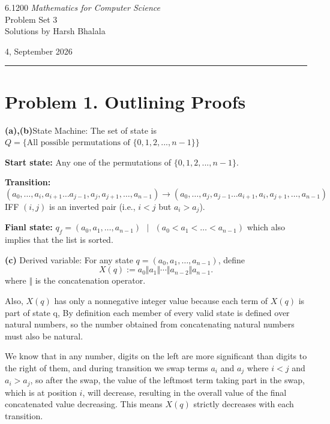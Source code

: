 \documentclass{article}
\begin{document}
\noindent
\begin{minipage}[t]{0.68\textwidth}
    {\large 6.1200 \textit{Mathematics for Computer Science}}\\[4pt]
    {\large Problem Set 3}\\[4pt]
    {\large Solutions by Harsh Bhalala}
\end{minipage}%
\hfill
\begin{minipage}[t]{0.27\textwidth}
    \raggedleft
    {\large 4, September 2026}
\end{minipage}

\vspace{6pt}

\noindent\rule{\textwidth}{0.5pt}

\section*{Problem 1. Outlining Proofs}

\textbf{(a),(b)}State Machine:
The set of state is $Q = \{ \text{All possible permutations of } \{0,1,2,...,{n-1}\} \}$

\textbf{Start state:} Any one of the permutations of $\{0,1,2,...,{n-1}\}$.

\textbf{Transition:}
\[ (a_0,\dots ,a_i,a_{i+1} \dots a_{j-1},a_j,a_{j+1},\dots,a_{n-1}) \rightarrow (a_0,\dots ,a_j,a_{j-1} \dots a_{i+1},a_i,a_{j+1},\dots,a_{n-1}) \]
IFF $(i, j)$ is an inverted pair (i.e., $i < j$ but $a_i > a_j$).

\textbf{Fianl state:}
$q_f = (a_0,a_1, \dots ,a_{n-1})\text{ } |\text{ }(a_0 < a_1 < \dots < a_{n-1})$ which also implies that the list is sorted.


\noindent\textbf{(c)} Derived variable: For any state
$q = (a_0, a_1, \ldots, a_{n-1})$, define
\[
X(q) := a_0 \Vert a_1 \Vert \cdots \Vert a_{n-2} \Vert a_{n-1}.
\]
where $\Vert$ is the concatenation operator.

Also, $X(q)$ has only a nonnegative integer value because each term of $X(q)$ is part of state q, By definition
each member of every valid state is defined over natural numbers, so the number obtained from concatenating natural numbers must also be natural.

We know that in any number, digits on the left are more significant than digits to the right of them, and during transition we swap terms $a_i$ and $a_j$
where $i < j$ and $a_i > a_j$, so after the swap, the value of the leftmost term taking part in the swap, which is at position $i$, will decrease, resulting in the overall value
of the final concatenated value decreasing. This means $X(q)$ strictly decreases with each transition.
\end{document}

